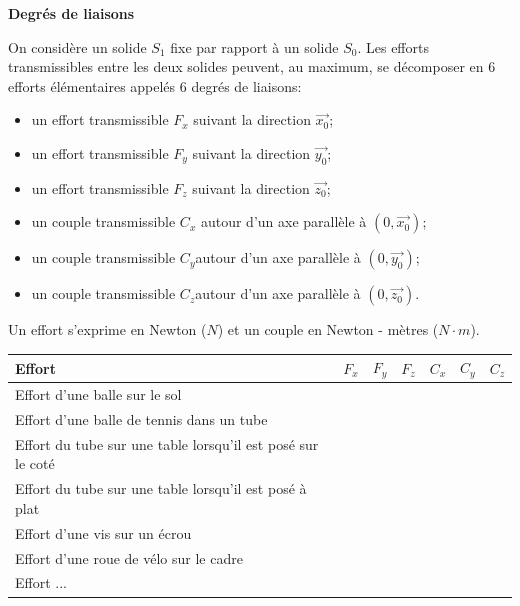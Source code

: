 \documentclass[10pt,oneside]{article}
\begin{document}
\begin{defi}
\textbf{Degrés de liaisons}

On considère un solide $S_1$ fixe par rapport à un solide $S_0$. Les efforts transmissibles  entre les deux solides peuvent, au maximum, se décomposer en 6 efforts élémentaires appelés 6 degrés de liaisons:
\vspace{.25cm}

\begin{minipage}[c]{.4\linewidth}
\begin{itemize}
\item un effort transmissible $F_x$ suivant la direction $\overrightarrow{x_0}$;
\item un effort transmissible $F_y$ suivant la direction $\overrightarrow{y_0}$;
\item un effort transmissible $F_z$ suivant la direction $\overrightarrow{z_0}$;
\end{itemize}
\end{minipage} \hfill
\begin{minipage}[c]{.4\linewidth}
\begin{itemize}
\item un couple transmissible $C_x$ autour d'un axe parallèle à $\left(0,\overrightarrow{x_0}\right)$;
\item un couple transmissible $C_y$autour d'un axe parallèle à $\left(0,\overrightarrow{y_0}\right)$;
\item un couple transmissible $C_z$autour d'un axe parallèle à $\left(0,\overrightarrow{z_0}\right)$.
\end{itemize}
\end{minipage}

\vspace{.25cm}

Un effort s'exprime en Newton ($N$) et un couple en Newton - mètres ($N\cdot m$).
\end{defi}

\begin{exemple}
\begin{center}
\begin{tabular}{|l|c|c|c|c|c|c|}

\hline 
Effort & $F_x$ & $F_y$ & $F_z$ &  $C_x$ &  $C_y$ &  $C_z$ \\
\hline 
Effort d'une balle sur le sol & & & & & & \\
\hline 
Effort d'une balle de tennis dans un tube & & & & & & \\
\hline 
Effort du tube sur une table lorsqu'il est posé sur le coté  & & & & & & \\
\hline 
Effort du tube sur une table lorsqu'il est posé à plat  & & & & & & \\
\hline 
Effort d'une vis sur un écrou  & & & & & & \\
\hline 
Effort d'une roue de vélo sur le cadre  & & & & & & \\
\hline 
Effort ... & & & & & & \\
\hline 
\end{tabular}
\end{center}


\end{exemple}
\end{document}
